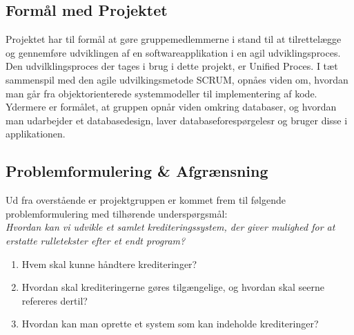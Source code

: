 \subsection{Formål med Projektet}
Projektet har til formål at gøre gruppemedlemmerne i stand til at tilrettelægge og gennemføre udviklingen af en softwareapplikation i en agil udviklingsproces. Den udvilklingsproces der tages i brug i dette projekt, er Unified Proces. I tæt sammenspil med den agile udvilkingsmetode SCRUM, opnåes viden om, hvordan man går fra objektorienterede systemmodeller til implementering af kode. Ydermere er formålet, at gruppen opnår viden omkring databaser, og hvordan man udarbejder et databasedesign, laver databaseforespørgelesr og bruger disse i applikationen.


\subsection{Problemformulering \& Afgrænsning}
Ud fra overstående er projektgruppen er kommet frem til følgende problemformulering med tilhørende underspørgsmål:\\

\noindent
\textit{Hvordan kan vi udvikle et samlet krediteringssystem, der giver mulighed for at erstatte rulletekster efter et endt program?}

\begin{enumerate}
    \item Hvem skal kunne håndtere krediteringer?
    \item Hvordan skal krediteringerne gøres tilgængelige, og hvordan skal seerne refereres dertil?
    \item Hvordan kan man oprette et system som kan indeholde krediteringer?\\ %
\end{enumerate}


